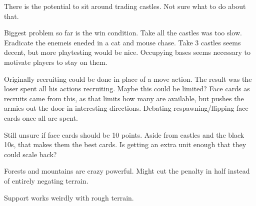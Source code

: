 \documentclass{article}
\begin{document}
There is the potential to sit around trading castles.  Not sure what to do about that.

Biggest problem so far is the win condition.  Take all the castles was too slow.  Eradicate the enemeis eneded in a cat and mouse chase.  Take 3 castles seems decent, but more playtesting would be nice.  Occupying bases seems necessary to motivate players to stay on them.

Originally recruiting could be done in place of a move action.  The result was the loser spent all his actions recruiting.  Maybe this could be limited?  Face cards as recruits came from this, as that limits how many are available, but pushes the armies out the door in interesting directions.  Debating respawning/flipping face cards once all are spent.

Still unsure if face cards should be 10 points.  Aside from castles and the black 10s, that makes them the best cards.  Is getting an extra unit enough that they could scale back?

Forests and mountains are crazy powerful.  Might cut the penalty in half instead of entirely negating terrain.

Support works weirdly with rough terrain.  
\end{document}
